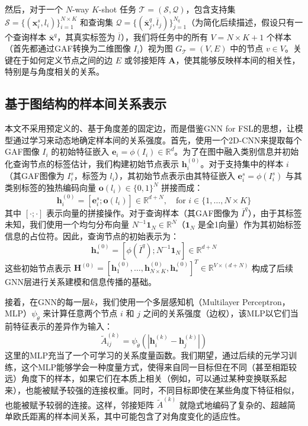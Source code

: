 然后，对于一个 $N$-way $K$-shot 任务 $\mathcal{T} = (\mathcal{S}, \mathcal{Q})$，包含支持集 $\mathcal{S} = \{(\mathbf{x}_i^s, l_i)\}_{i=1}^{N \times K}$ 和查询集 $\mathcal{Q} = \{(\overline{\mathbf{x}}_j^q, \overline{l}_j)\}_{j=1}^{N_q}$（为简化后续描述，假设只有一个查询样本 $\overline{\mathbf{x}}^q$，其真实标签为 $\overline{l}$），我们将任务中的所有 $V = N \times K + 1$ 个样本（首先都通过GAF转换为二维图像 $I_i$）视为图 $G_{\mathcal{T}} = (V, E)$ 中的节点 $v \in V$。关键在于如何定义节点之间的边 $E$ 或邻接矩阵 $\mathbf{A}$，使其能够反映样本间的相关性，特别是与角度相关的关系。

\subsection{基于图结构的样本间关系表示}
\label{subsec:graph_relation_representation}

本文不采用预定义的、基于角度差的固定边，而是借鉴GNN for FSL的思想，让模型通过学习来动态地确定样本间的关系强度。首先，使用一个2D-CNN来提取每个GAF图像 $I_i$ 的初始特征嵌入 $\mathbf{e}_i = \phi(I_i) \in \mathbb{R}^d$。为了在图中融入类别信息并初始化查询节点的标签估计，我们构建初始节点表示 $\mathbf{h}_i^{(0)}$。对于支持集中的样本 $i$（其GAF图像为 $I_i^s$，标签为 $l_i$），其初始节点表示由其特征嵌入 $\mathbf{e}_i^s = \phi(I_i^s)$ 与其类别标签的独热编码向量 $\mathbf{o}(l_i) \in \{0, 1\}^N$ 拼接而成：
\begin{equation}
    \mathbf{h}_i^{(0)} = [\mathbf{e}_i^s ; \mathbf{o}(l_i)] \in \mathbb{R}^{d+N}, \quad \text{for } i \in \{1, \dots, N \times K\}
    \label{eq:support_node_init}
\end{equation}
其中 $[\cdot ; \cdot]$ 表示向量的拼接操作。对于查询样本（其GAF图像为 $\overline{I}^q$），由于其标签未知，我们使用一个均匀分布向量 $N^{-1}\mathbf{1}_N \in \mathbb{R}^N$（$\mathbf{1}_N$ 是全1向量）作为其初始标签信息的占位符。因此，查询节点的初始表示为：
\begin{equation}
    \mathbf{h}_*^{(0)} = [\phi(\overline{I}^q) ; N^{-1}\mathbf{1}_N] \in \mathbb{R}^{d+N}
    \label{eq:query_node_init}
\end{equation}
这些初始节点表示 $\mathbf{H}^{(0)} = [\mathbf{h}_1^{(0)}, \dots, \mathbf{h}_{N \times K}^{(0)}, \mathbf{h}_*^{(0)}]^T \in \mathbb{R}^{V \times (d+N)}$ 构成了后续GNN层进行关系建模和信息传播的基础。

接着，在GNN的每一层$k$，我们使用一个多层感知机（Multilayer Perceptron，MLP）$\psi_{\tilde{\theta}}$ 来计算任意两个节点 $i$ 和 $j$ 之间的关系强度（边权），该MLP以它们当前特征表示的差异作为输入：
\begin{equation}
    \tilde{A}_{ij}^{(k)} = \psi_{\tilde{\theta}}(|\mathbf{h}_i^{(k)} - \mathbf{h}_j^{(k)}|)
    \label{eq:edge_weight_mlp}
\end{equation}
这里的MLP充当了一个可学习的关系度量函数。我们期望，通过后续的元学习训练，这个MLP能够学会一种度量方式，使得来自同一目标但在不同（甚至相距较远）角度下的样本，如果它们在本质上相关（例如，可以通过某种变换联系起来），也能被赋予较强的连接权重。同时，不同目标即使在某些角度下特征相似，也能被赋予较弱的连接。这样，邻接矩阵 $\tilde{A}^{(k)}$ 就隐式地编码了复杂的、超越简单欧氏距离的样本间关系，其中可能包含了对角度变化的适应性。

